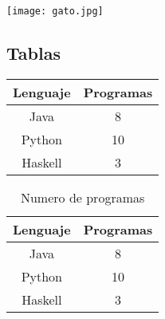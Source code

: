 \documentclass{article}
\begin{document}
       \texttt{[image: gato.jpg]}

       \subsection{Tablas}

       \begin{tabular}{ | c | c |}
         \hline
         Lenguaje & Programas\\
         \hline
         Java & 8 \\
         Python & 10 \\
         Haskell & 3 \\
         \hline
       \end{tabular}

       \begin{table}[H]
         \centering
          \begin{tabular}{ | c | c |}
         \hline
         Lenguaje & Programas\\
         \hline
         Java & 8 \\
         Python & 10 \\
         Haskell & 3 \\
         \hline
          \end{tabular}
          \caption{Numero de programas}
          \label{tab:programas}
    \end{table}
\end{document}
